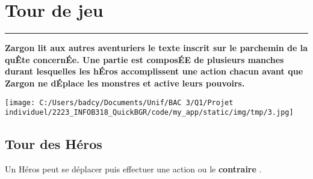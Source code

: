 \documentclass{scrartcl}%
\begin{document}
%
\sectionfont{\color{mygreen}}%
\subsectionfont{\color{mygreen}}%
\subsubsectionfont{\color{mygreen}}%
\section{ Tour de jeu
}%
\label{sec:Tourdejeu}%
\textcolor{mygreen}{\rule{18cm}{0.07cm}}\break%
\textcolor{mygreen}{%
\textbf{Zargon lit aux autres aventuriers le texte inscrit sur le parchemin de la quÊte concernÉe. Une partie est composÉE de plusieurs manches durant lesquelles les hÉros accomplissent une action chacun avant que Zargon ne dÉplace les monstres et active leurs pouvoirs.}%
}%

%
%
\begin{center}\texttt{[image: C:/Users/badcy/Documents/Unif/BAC 3/Q1/Projet individuel/2223\_INFOB318\_QuickBGR/code/my\_app/static/img/tmp/3.jpg]}\end{center}%



%
\subsection{ Tour des Héros
}%
\label{subsec:TourdesHros}%
Un Héros peut se déplacer puis effectuer une action ou le %
\textcolor{mygreen}{%
\textbf{contraire}%
}%
. 


%
\end{document}
